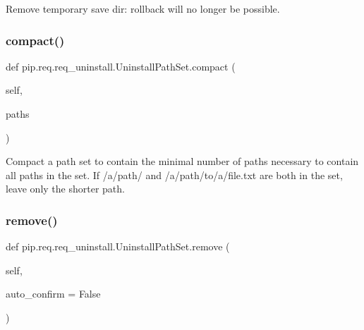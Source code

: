 \begin{DoxyVerb}Remove temporary save dir: rollback will no longer be possible.\end{DoxyVerb}
 \mbox{\label{classpip_1_1req_1_1req__uninstall_1_1_uninstall_path_set_a25323acc546b28ca2a8ee8719c733c3d}} 
\subsubsection{\texorpdfstring{compact()}{compact()}}
{\footnotesize\ttfamily def pip.\+req.\+req\+\_\+uninstall.\+Uninstall\+Path\+Set.\+compact (\begin{DoxyParamCaption}\item[{}]{self,  }\item[{}]{paths }\end{DoxyParamCaption})}

\begin{DoxyVerb}Compact a path set to contain the minimal number of paths
necessary to contain all paths in the set. If /a/path/ and
/a/path/to/a/file.txt are both in the set, leave only the
shorter path.\end{DoxyVerb}
 \mbox{\label{classpip_1_1req_1_1req__uninstall_1_1_uninstall_path_set_af085c6d453dc2e63a6f1752239a91a0f}} 
\subsubsection{\texorpdfstring{remove()}{remove()}}
{\footnotesize\ttfamily def pip.\+req.\+req\+\_\+uninstall.\+Uninstall\+Path\+Set.\+remove (\begin{DoxyParamCaption}\item[{}]{self,  }\item[{}]{auto\+\_\+confirm = {\ttfamily False} }\end{DoxyParamCaption})}


